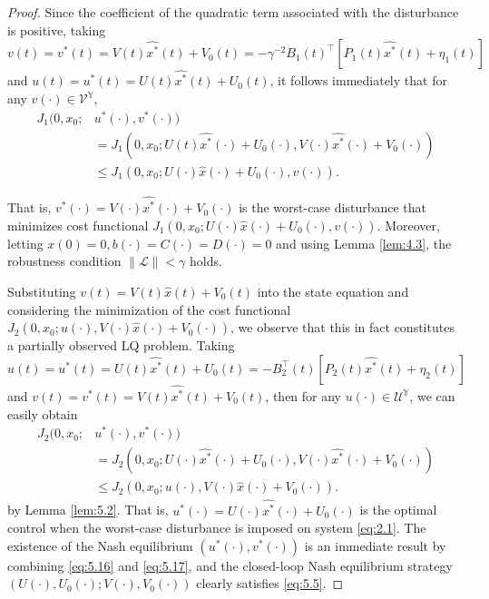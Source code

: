 \documentclass[10pt,a4paper]{amsart}
\begin{document}
\begin{proof}
	Since the coefficient of the quadratic term associated with the disturbance is positive, taking $v(t) = v^*(t) = V(t)\widehat{x^*}(t) + V_0(t) = -\gamma^{-2}B_1(t)^{\top}[P_1(t)\widehat{x^*}(t) + \eta_1(t)]$ and $u(t) = u^*(t) = U(t)\widehat{x^*}(t) + U_0(t)$, it follows immediately that for any $v(\cdot) \in \mathcal{V}^{\mathbb{Y}}$,
	\begin{equation}\label{eq:5.16}
		\begin{aligned}
			J_1(0,x_0;&u^*(\cdot),v^*(\cdot)) \\
			&= J_1(0,x_0;U(t)\widehat{x^*}(\cdot) + U_0(\cdot),V(\cdot)\widehat{x^*}(\cdot) + V_0(\cdot))\\
			&\leq J_1(0,x_0;U(\cdot)\widehat{x}(\cdot) + U_0(\cdot),v(\cdot)).
		\end{aligned}
	\end{equation}
	
	That is, $v^*(\cdot) = V(\cdot)\widehat{x^*}(\cdot) + V_0(\cdot)$ is the worst-case disturbance that minimizes cost functional $J_1(0,x_0;U(\cdot)\widehat{x}(\cdot) + U_0(\cdot),v(\cdot))$. Moreover, letting $x(0) = 0, b(\cdot) = C(\cdot) = D(\cdot) = 0$ and using Lemma \ref{lem:4.3}, the robustness condition $\|\mathcal{L}\| < \gamma$ holds.
	
	Substituting $v(t) = V(t)\widehat{x}(t) + V_0(t)$ into the state equation and considering the minimization of the cost functional $J_2(0,x_0;u(\cdot),V(\cdot)\widehat{x}(\cdot) + V_0(\cdot))$, we observe that this in fact constitutes a partially observed LQ problem. Taking $u(t) = u^*(t) = U(t)\widehat{x^*}(t) + U_0(t) = -B_2^{\top}(t)[P_2(t)\widehat{x^*}(t) + \eta_2(t)]$ and $v(t) = v^*(t) = V(t)\widehat{x^*}(t) + V_0(t)$, then for any $u(\cdot) \in \mathcal{U}^{\mathbb{Y}}$, we can easily obtain 
	\begin{equation}\label{eq:5.17}
		\begin{aligned}
			J_2(0,x_0;&u^*(\cdot),v^*(\cdot)) \\
			&= J_2(0,x_0;U(\cdot)\widehat{x^*}(\cdot) + U_0(\cdot),V(\cdot)\widehat{x^*}(\cdot) + V_0(\cdot))\\
			&\leq J_2(0,x_0;u(\cdot),V(\cdot)\widehat{x}(\cdot) + V_0(\cdot)).
		\end{aligned}
	\end{equation}
	by Lemma \ref{lem:5.2}. That is, $u^*(\cdot) = U(\cdot)\widehat{x^*}(\cdot) + U_0(\cdot)$ is the optimal control when the worst-case disturbance is imposed on system \eqref{eq:2.1}. The existence of the Nash equilibrium $(u^*(\cdot), v^*(\cdot))$ is an immediate result by combining \eqref{eq:5.16} and \eqref{eq:5.17}, and the closed-loop Nash equilibrium strategy $(U(\cdot),U_0(\cdot);V(\cdot),V_0(\cdot))$ clearly satisfies \eqref{eq:5.5}.
\end{proof}
\end{document}
